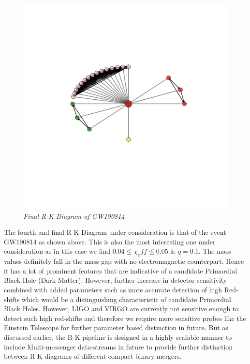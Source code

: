     \begin{figure}[H]
        \centering
        \includegraphics[width=1.0\linewidth]{images/GW190814_RK_Diagram.png}
        \caption{\textit{Final R-K Diagram of GW190814}}
        \label{fig:LIGO14_PlaceHolder_fig}
    \end{figure}

The fourth and final R-K Diagram under consideration is that of the event GW190814 as shown above. This is also the most interesting one under consideration as in this case we find $0.04 \le \chi_eff \le 0.05$ \&  $q = 0.1$. The mass values  definitely fall in the mass gap with no electromagnetic counterpart. Hence it has a lot of prominent features that are indicative of a candidate Primordial Black Hole (Dark Matter). However, further increase in detector sensitivity combined with added parameters such as more accurate detection of high Red-shifts which would be a distinguishing characteristic of candidate Primordial Black Holes. However, LIGO and VIRGO are currently not sensitive enough to detect such high red-shifts and therefore we require more sensitive probes like the Einstein Telescope for further parameter based distinction in future. But as discussed earlier, the R-K pipeline is designed in a highly scalable manner to include Multi-messenger data-streams in future to provide further distinction between R-K diagrams of different compact binary mergers.  



